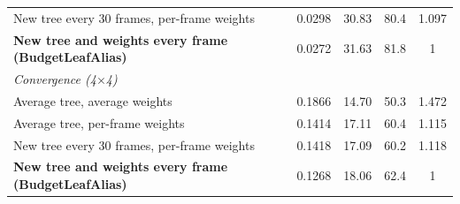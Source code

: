 \begin{table}[t]
{\begin{tabular}{l c c c c}
New tree every 30 frames, per-frame weights & 0.0298 & 30.83 & 80.4 & 1.097 \\
\textbf{New tree and weights every frame (BudgetLeafAlias)} & 0.0272 & 31.63 & 81.8 & 1 \\
\midrule
\multicolumn{5}{l}{\textit{Convergence (4$\times$4)}} \\
Average tree, average weights & 0.1866 & 14.70 & 50.3 & 1.472 \\
Average tree, per-frame weights & 0.1414 & 17.11 & 60.4 & 1.115 \\
New tree every 30 frames, per-frame weights & 0.1418 & 17.09 & 60.2 & 1.118 \\
\textbf{New tree and weights every frame (BudgetLeafAlias)} & 0.1268 & 18.06 & 62.4 & 1 \\
\bottomrule
\end{tabular}}
\end{table}
